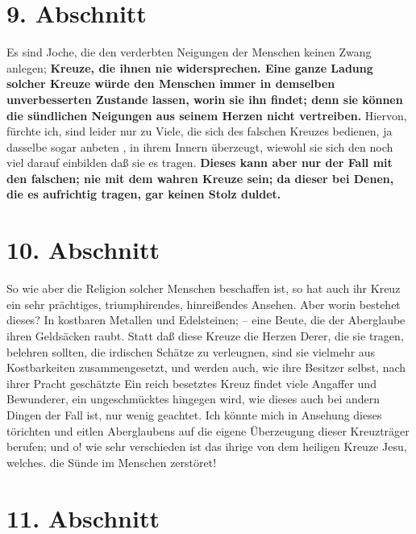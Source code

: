 \section{9. Abschnitt} \label{kap5_ab9}

Es sind Joche, die den verderbten Neigungen der Menschen keinen Zwang anlegen;
\textbf{Kreuze, die ihnen nie widersprechen. Eine ganze Ladung solcher Kreuze
würde den
Menschen immer in demselben unverbesserten Zustande lassen, worin sie ihn
findet; denn sie können die sündlichen Neigungen aus seinem Herzen nicht
vertreiben.} Hiervon, fürchte ich, sind leider nur zu Viele, die sich des
falschen Kreuzes  bedienen, ja dasselbe sogar anbeten
, in ihrem Innern überzeugt,
wiewohl sie sich den noch viel darauf einbilden daß sie es tragen.
\textbf{Dieses kann
aber nur der Fall mit den falschen; nie mit dem wahren Kreuze sein; da dieser
bei Denen, die es aufrichtig tragen, gar keinen Stolz duldet.}

\section{10. Abschnitt} \label{kap5_ab10}

So wie aber die Religion solcher Menschen beschaffen ist, so hat auch ihr Kreuz
ein sehr prächtiges, triumphirendes, hinreißendes Ansehen. Aber worin bestehet
dieses? In kostbaren Metallen und Edelsteinen; -- eine Beute, die der Aberglaube
ihren Geldsäcken raubt. Statt daß diese Kreuze die Herzen Derer, die sie tragen,
belehren sollten, die irdischen Schätze zu verleugnen, sind sie vielmehr aus
Kostbarkeiten zusammengesetzt, und werden auch, wie ihre Besitzer selbst, nach
ihrer Pracht geschätzte Ein reich besetztes Kreuz findet viele Angaffer und
Bewunderer, ein ungeschmücktes hingegen wird, wie dieses auch bei andern Dingen
der Fall ist, nur wenig geachtet. Ich könnte mich in Ansehung dieses törichten
und eitlen Aberglaubens  auf die eigene Überzeugung dieser Kreuzträger berufen;
und o! wie sehr verschieden ist das ihrige von dem heiligen Kreuze Jesu,
welches. die Sünde im Menschen zerstöret!

\section{11. Abschnitt} \label{kap5_ab11}

